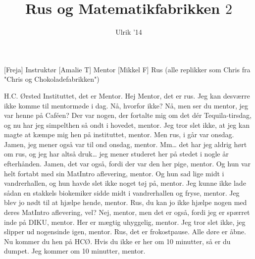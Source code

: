 \documentclass[a4paper,11pt]{article}
\title{Rus og Matematikfabrikken $2$}
\author{Ulrik '14}
\begin{document}
\maketitle

\begin{roles}
[Freja] Instruktør
[Amalie T] Mentor
[Mikkel F] Rus (alle replikker som Chris fra "Chris og Chokoladefabrikken")

\end{roles}

\begin{props}

\end{props}

\begin{sketch}



 H.C. Ørsted Instituttet, det er Mentor.
 Hej Mentor, det er rus. Jeg kan desværre ikke komme til mentormøde i dag.
 Nå, hvorfor ikke?
 Nå, men ser du mentor, jeg var henne på Caféen? Der var nogen, der fortalte mig om det dér Tequila-tirsdag, og nu har jeg simpelthen så ondt i hovedet, mentor. Jeg tror slet ikke, at jeg kan magte at kæmpe mig hen på instituttet, mentor.
 Men rus, i går var onsdag.
 Jamen, jeg mener også var til ond onsdag, mentor.
 Mm… det har jeg aldrig hørt om rus, og jeg har altså druk… jeg mener studeret her på stedet i nogle år efterhånden.
 Jamen, det var også, fordi der var den her pige, mentor. Og hun var helt fortabt med sin MatIntro aflevering, mentor. Og hun sad lige midt i vandrerhallen, og hun havde slet ikke noget tøj på, mentor. Jeg kunne ikke lade sådan en stakkels biokemiker sidde midt i vandrerhallen og fryse, mentor. Jeg blev jo nødt til at hjælpe hende, mentor.
 Rus, du kan jo ikke hjælpe nogen med deres MatIntro aflevering, vel?
 Nej, mentor, men det er også, fordi jeg er spærret inde på DIKU, mentor. Her er mægtig uhyggelig, mentor. Jeg tror slet ikke, jeg slipper ud nogensinde igen, mentor.
 Rus, det er frokostpause. Alle døre er åbne. Nu kommer du hen på HCØ. Hvis du ikke er her om 10 minutter, så er du dumpet.
 Jeg kommer om 10 minutter, mentor.




\end{sketch}
\end{document}

